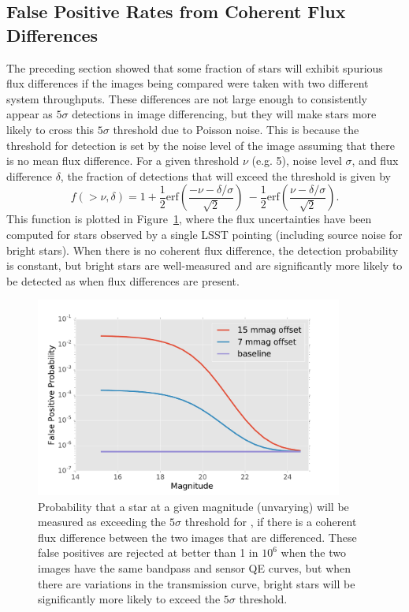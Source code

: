 \documentclass[DM]{lsstdoc}
\begin{document}
\subsection{False Positive Rates from Coherent Flux Differences}

The preceding section showed that some fraction of stars will exhibit spurious
flux differences if the images being compared were taken with two different
system throughputs. These differences are not large enough to consistently
appear as $5\sigma$ detections in image differencing, but they will make stars
more likely to cross this $5\sigma$ threshold due to Poisson noise. This is
because the threshold for detection is set by the noise level of the image
assuming that there is no mean flux difference. For a given threshold $\nu$
(e.g. 5), noise level $\sigma$, and flux difference $\delta$, the fraction of
detections that will exceed the threshold is given by
%
\begin{equation}
  f( > \nu, \delta) = 1 + \frac{1}{2}\textrm{erf}\left( \frac{-\nu - \delta/\sigma}{\sqrt{2}}\right) \
  - \frac{1}{2}\textrm{erf}\left( \frac{\nu - \delta/\sigma}{\sqrt{2}}\right).
\end{equation}
%
This function is plotted in Figure~\ref{fig:false_positive_prob}, where the flux
uncertainties have been computed for stars observed by a single LSST pointing
(including source noise for bright stars). When there is no coherent flux
difference, the detection probability is constant, but bright stars are
well-measured and are significantly more likely to be detected as \DIASources
when flux differences are present.

\begin{figure}
\includegraphics[width=0.9\textwidth]{figures/false_positive_prob.pdf}
\caption{Probability that a star at a given magnitude (unvarying) will be
measured as exceeding the $5\sigma$ threshold for \DIASources, if there is a
coherent flux difference between the two images that are differenced. These
false positives are rejected at better than 1 in $10^6$ when the two images have
the same bandpass and sensor QE curves, but when there are variations in the
transmission curve, bright stars will be significantly more likely to exceed the
$5\sigma$ threshold.
\label{fig:false_positive_prob}}
\end{figure}
\end{document}
